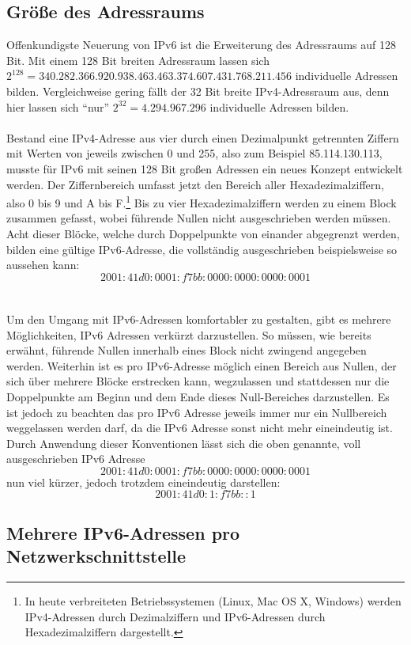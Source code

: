 \documentclass[a4paper,12pt]{scrartcl}
\begin{document}
\subsection{Gr\"o{\ss}e  des Adressraums}
\label{subsec:2.1}
Offenkundigste Neuerung von IPv6 ist die Erweiterung des Adressraums auf 128 Bit. Mit einem 128 Bit breiten Adressraum lassen sich \\
$2^{128} = 340.282.366.920.938.463.463.374.607.431.768.211.456$ individuelle Adressen bilden. Vergleichweise gering fällt der 32 Bit breite IPv4-Adressraum aus, denn hier lassen sich "`nur"' $2^{32} = 4.294.967.296$ individuelle Adressen bilden. \\
\\
Bestand eine IPv4-Adresse aus vier durch einen Dezimalpunkt getrennten Ziffern mit Werten von jeweils zwischen 0 und 255, also zum Beispiel 85.114.130.113, musste für IPv6 mit seinen 128 Bit großen Adressen ein neues Konzept entwickelt werden.
Der Ziffernbereich umfasst jetzt den Bereich aller Hexadezimalziffern, also 0 bis 9 und A bis F.\footnote{In heute verbreiteten Betriebssystemen (Linux, Mac OS X, Windows) werden IPv4-Adressen durch Dezimalziffern und IPv6-Adressen durch Hexadezimalziffern dargestellt.} Bis zu vier Hexadezimalziffern werden zu einem Block zusammen gefasst, wobei führende Nullen nicht ausgeschrieben werden m\"ussen. Acht dieser Blöcke, welche durch Doppelpunkte von einander abgegrenzt werden, bilden eine gültige IPv6-Adresse, die vollständig ausgeschrieben  beispielsweise so aussehen kann:  \[ 2001:41d0:0001:f7bb:0000:0000:0000:0001 \]\\
\\
Um den Umgang mit IPv6-Adressen komfortabler zu gestalten, gibt es mehrere Möglichkeiten, IPv6 Adressen verkürzt darzustellen. So müssen, wie bereits erwähnt, führende Nullen innerhalb eines Block nicht zwingend angegeben werden. Weiterhin ist es pro IPv6-Adresse möglich einen Bereich aus Nullen, der sich über mehrere Blöcke erstrecken kann, wegzulassen und stattdessen nur die Doppelpunkte am Beginn und dem Ende dieses Null-Bereiches darzustellen. Es ist jedoch zu beachten das pro IPv6 Adresse jeweils immer nur ein Nullbereich weggelassen werden darf, da die IPv6 Adresse sonst nicht mehr eineindeutig ist. Durch Anwendung dieser Konventionen lässt sich die oben genannte, voll ausgeschrieben IPv6 Adresse
\[ 2001:41d0:0001:f7bb:0000:0000:0000:0001 \]
nun viel kürzer, jedoch trotzdem eineindeutig darstellen:
 \[ 2001:41d0:1:f7bb::1 \]
 

\subsection{Mehrere IPv6-Adressen pro Netzwerkschnittstelle}
\end{document}
